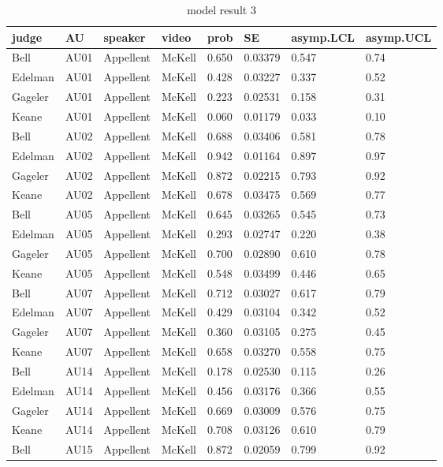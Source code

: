 \documentclass{monashthesis}
\begin{document}
\begin{center}
\begin{longtable}{llllllll}
\caption{model result 3}\\
\toprule
judge & AU & speaker & video & prob & SE & asymp.LCL & asymp.UCL \\
\midrule
\endhead
\bottomrule
\endfoot
Bell & AU01 & Appellent & McKell & 0.650 & 0.03379 & 0.547 & 0.74 \\
Edelman & AU01 & Appellent & McKell & 0.428 & 0.03227 & 0.337 & 0.52 \\
Gageler & AU01 & Appellent & McKell & 0.223 & 0.02531 & 0.158 & 0.31 \\
Keane & AU01 & Appellent & McKell & 0.060 & 0.01179 & 0.033 & 0.10 \\
Bell & AU02 & Appellent & McKell & 0.688 & 0.03406 & 0.581 & 0.78 \\
Edelman & AU02 & Appellent & McKell & 0.942 & 0.01164 & 0.897 & 0.97 \\
Gageler & AU02 & Appellent & McKell & 0.872 & 0.02215 & 0.793 & 0.92 \\
Keane & AU02 & Appellent & McKell & 0.678 & 0.03475 & 0.569 & 0.77 \\
Bell & AU05 & Appellent & McKell & 0.645 & 0.03265 & 0.545 & 0.73 \\
Edelman & AU05 & Appellent & McKell & 0.293 & 0.02747 & 0.220 & 0.38 \\
Gageler & AU05 & Appellent & McKell & 0.700 & 0.02890 & 0.610 & 0.78 \\
Keane & AU05 & Appellent & McKell & 0.548 & 0.03499 & 0.446 & 0.65 \\
Bell & AU07 & Appellent & McKell & 0.712 & 0.03027 & 0.617 & 0.79 \\
Edelman & AU07 & Appellent & McKell & 0.429 & 0.03104 & 0.342 & 0.52 \\
Gageler & AU07 & Appellent & McKell & 0.360 & 0.03105 & 0.275 & 0.45 \\
Keane & AU07 & Appellent & McKell & 0.658 & 0.03270 & 0.558 & 0.75 \\
Bell & AU14 & Appellent & McKell & 0.178 & 0.02530 & 0.115 & 0.26 \\
Edelman & AU14 & Appellent & McKell & 0.456 & 0.03176 & 0.366 & 0.55 \\
Gageler & AU14 & Appellent & McKell & 0.669 & 0.03009 & 0.576 & 0.75 \\
Keane & AU14 & Appellent & McKell & 0.708 & 0.03126 & 0.610 & 0.79 \\
Bell & AU15 & Appellent & McKell & 0.872 & 0.02059 & 0.799 & 0.92 \\

\end{longtable}
\end{center}
\end{document}
